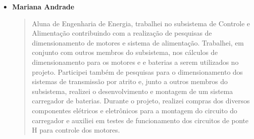 \begin{itemize}
    \item \textbf{Mariana Andrade}
    \begin{quote}
      Aluna de Engenharia de Energia, trabalhei no subsistema de Controle e 
      Alimentação contribuindo com a realização de pesquisas de dimensionamento 
      de motores e sistema de alimentação. Trabalhei, em conjunto com outros 
      membros do subsistema, nos cálculos de dimensionamento para os motores e 
      e baterias a serem utilizados no projeto. Participei também de pesquisas 
      para o dimensionamento dos sistemas de transmissão por atrito e, junto a 
      outros membros do subsistema, realizei o desenvolvimento e montagem de um 
      sistema carregador de baterias. Durante o projeto, realizei compras dos 
      diversos componentes elétricos e eletrônicos para a montagem do circuito 
      do carregador e auxiliei em testes de funcionamento dos circuitos de 
      ponte H para controle dos motores.
    \end{quote}
\end{itemize}
